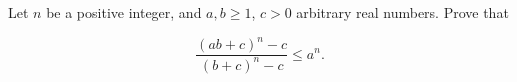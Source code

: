Let $n$ be a positive integer, and $a,b\ge 1$, $c>0$ arbitrary real numbers. Prove that

\[\frac{(ab+c)^n-c}{(b+c)^n-c}\le a^n.\]